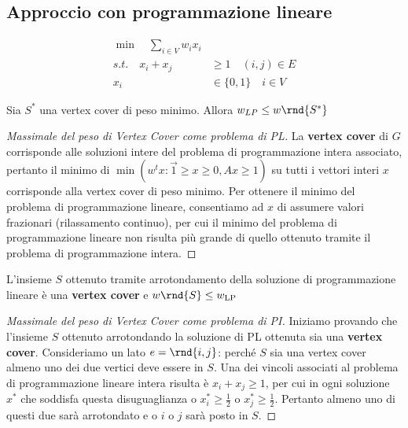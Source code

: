 \documentclass[\main/main.tex]{subfiles}
\begin{document}
\subsection{Approccio con programmazione lineare}
\begin{multicols}{2}
\begin{definition}
\begin{align*}
  \min \quad \sum_{i \in V} w_{i} x_{i}&\\  
  s.t. \quad x_{i}+x_{j} &\geq 1 \quad(i, j) \in E\\
  x_{i} &\in\{0,1\} \quad i \in V
\end{align*}
\end{definition}
\begin{lemma}
    Sia \(S^*\) una vertex cover di peso minimo. Allora \(w_{LP} \leq w\rnd{S^*}\)
\end{lemma}
\begin{proof}[Massimale del peso di Vertex Cover come problema di PL]
    La \textbf{vertex cover} di \(G\) corrisponde alle soluzioni intere del problema di programmazione intera associato, pertanto il minimo di \(\min \left(w^{t} x : \overrightarrow{1} \geq x \geq 0, A x \geq 1\right)\) su tutti i vettori interi \(x\) corrisponde alla vertex cover di peso minimo. Per ottenere il minimo del problema di programmazione lineare, consentiamo ad \(x\) di assumere valori frazionari (rilassamento continuo), per cui il minimo del problema di programmazione lineare non risulta più grande di quello ottenuto tramite il problema di programmazione intera.
\end{proof}
\vfill\null
\columnbreak
\begin{lemma}
    L'insieme \(S\) ottenuto tramite arrotondamento della soluzione di programmazione lineare è una \textbf{vertex cover} e \(w\rnd{S} \leq w_{\text{LP}}\)
\end{lemma}
\begin{proof}[Massimale del peso di Vertex Cover come problema di PI]
    Iniziamo provando che l'insieme \(S\) ottenuto arrotondando la soluzione di PL ottenuta sia una \textbf{vertex cover}. Consideriamo un lato \(e = \rnd{i,j}\): perché \(S\) sia una vertex cover almeno uno dei due vertici deve essere in \(S\). Una dei vincoli associati al problema di programmazione lineare intera risulta è \(x_{i}+x_{j} \geq 1\), per cui in ogni soluzione \(x^*\) che soddisfa questa disuguaglianza o \(x_{i}^{*} \geq \frac{1}{2}\) o \(x_{j}^{*} \geq \frac{1}{2}\). Pertanto almeno uno di questi due sarà arrotondato e o \(i\) o \(j\) sarà posto in \(S\).
    

\end{proof}
\end{multicols}
\end{document}

